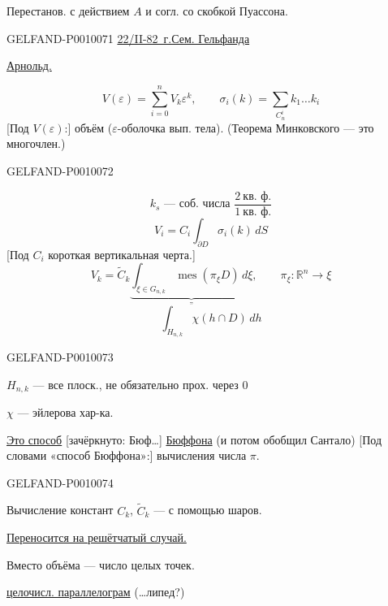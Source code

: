 Перестанов. с действием $A$ и согл. со скобкой Пуассона.

\begin{flushright}\end{flushright}


\begin{GelfandAdjacentEvidence}{GELFAND-P001007}{1}
\underline{22/II-82~г.}\qquad \underline{Сем. Гельфанда}

\underline{Арнольд.}

\[
V(\varepsilon)=\sum_{i=0}^{n}V_k\varepsilon^k,\qquad
\sigma_i(k)=\sum_{C_n^i}k_1\ldots k_i
\]
[Под $V(\varepsilon)$:] объём ($\varepsilon$-оболочка вып. тела). \quad (Теорема Минковского --- это многочлен.)
\end{GelfandAdjacentEvidence}
\begin{GelfandAdjacentEvidence}{GELFAND-P001007}{2}


\[
k_s\text{ --- соб. числа }\frac{2\ \text{кв. ф.}}{1\ \text{кв. ф.}}
\]
\[
V_i=C_i\int_{\partial D}\sigma_i(k)\,dS
\]
[Под $C_i$ короткая вертикальная черта.]
\[
V_k=\widetilde C_k
\underbrace{\int_{\xi\in G_{n,k}}\operatorname{mes}(\pi_\xi D)\,d\xi}_{\text{''}},
\qquad \pi_\xi\colon \mathbb R^n\longrightarrow\xi
\]
\[
\int_{H_{n,k}}\chi(h\cap D)\,dh
\]
\end{GelfandAdjacentEvidence}
\begin{GelfandAdjacentEvidence}{GELFAND-P001007}{3}


$H_{n,k}$ --- все плоск., не обязательно прох. через $0$

$\chi$ --- эйлерова хар-ка.

\underline{Это способ} [зачёркнуто: Бюф\ldots] \underline{Бюффона} (и потом обобщил Сантало)
[Под словами «способ Бюффона»:] вычисления числа $\pi$.
\end{GelfandAdjacentEvidence}
\begin{GelfandAdjacentEvidence}{GELFAND-P001007}{4}


Вычисление констант $C_k$, $\widetilde C_k$ --- с помощью шаров.

\underline{Переносится на решётчатый случай.}

Вместо объёма --- число целых точек.

\underline{целочисл. параллелограм} (\ldots липед?)
\end{GelfandAdjacentEvidence}
